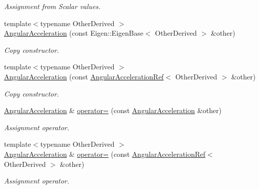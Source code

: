 \begin{DoxyCompactItemize}
\begin{DoxyCompactList}\small\item\em Assignment from Scalar values. \end{DoxyCompactList}\item 
{\footnotesize template$<$typename Other\+Derived $>$ }\\\hyperlink{classow__core_1_1AngularAcceleration_a2d004049ef71a1522e61bce3ff5e4bfc}{Angular\+Acceleration} (const Eigen\+::\+Eigen\+Base$<$ Other\+Derived $>$ \&other)
\begin{DoxyCompactList}\small\item\em Copy constructor. \end{DoxyCompactList}\item 
{\footnotesize template$<$typename Other\+Derived $>$ }\\\hyperlink{classow__core_1_1AngularAcceleration_a677a6f6e1b0a5b5618502b42c33b7b53}{Angular\+Acceleration} (const \hyperlink{classow__core_1_1AngularAccelerationRef}{Angular\+Acceleration\+Ref}$<$ Other\+Derived $>$ \&other)
\begin{DoxyCompactList}\small\item\em Copy constructor. \end{DoxyCompactList}\item 
\hyperlink{classow__core_1_1AngularAcceleration}{Angular\+Acceleration} \& \hyperlink{classow__core_1_1AngularAcceleration_a0224c9ac33be71c41fdcfe1c9c2d7195}{operator=} (const \hyperlink{classow__core_1_1AngularAcceleration}{Angular\+Acceleration} \&other)\hypertarget{classow__core_1_1AngularAcceleration_a0224c9ac33be71c41fdcfe1c9c2d7195}{}\label{classow__core_1_1AngularAcceleration_a0224c9ac33be71c41fdcfe1c9c2d7195}

\begin{DoxyCompactList}\small\item\em Assignment operator. \end{DoxyCompactList}\item 
{\footnotesize template$<$typename Other\+Derived $>$ }\\\hyperlink{classow__core_1_1AngularAcceleration}{Angular\+Acceleration} \& \hyperlink{classow__core_1_1AngularAcceleration_a5245c84dfcefe874cb9e17683edbb4df}{operator=} (const \hyperlink{classow__core_1_1AngularAccelerationRef}{Angular\+Acceleration\+Ref}$<$ Other\+Derived $>$ \&other)\hypertarget{classow__core_1_1AngularAcceleration_a5245c84dfcefe874cb9e17683edbb4df}{}\label{classow__core_1_1AngularAcceleration_a5245c84dfcefe874cb9e17683edbb4df}

\begin{DoxyCompactList}\small\item\em Assignment operator. \end{DoxyCompactList}\end{DoxyCompactItemize}


